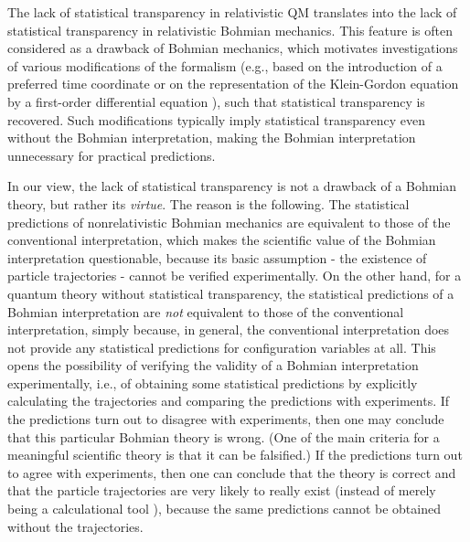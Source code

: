 \documentclass[11pt]{article}
\begin{document}
The lack of statistical transparency in relativistic QM
translates into the lack of statistical transparency in relativistic 
Bohmian mechanics. This feature is often considered as a drawback
of Bohmian mechanics, which motivates investigations of 
various modifications 
of the formalism (e.g., based on the introduction of a preferred 
time coordinate \cite{holpra} or on the representation of the 
Klein-Gordon equation by a first-order differential equation 
\cite{holNC}), 
such that statistical transparency is recovered.
Such modifications typically imply statistical transparency 
even without the Bohmian interpretation, making the Bohmian 
interpretation unnecessary for practical predictions.  

In our view, the lack of statistical transparency  
is not a drawback of a Bohmian theory, 
but rather its {\em virtue}. The reason is the following. 
The statistical predictions of nonrelativistic Bohmian 
mechanics are equivalent to those of the conventional 
interpretation, which makes the scientific value 
of the Bohmian interpretation questionable, because its basic 
assumption - the existence of particle trajectories - cannot 
be verified experimentally. On the other hand, for a quantum 
theory without statistical transparency, the statistical 
predictions of a Bohmian interpretation are {\em not} equivalent 
to those of the conventional interpretation, simply because,
in general,  
the conventional interpretation does not provide any 
statistical predictions for configuration variables at all. 
This opens the possibility
of verifying the validity of a Bohmian interpretation
experimentally,  
i.e., of obtaining some statistical predictions by explicitly 
calculating the trajectories and comparing the predictions with 
experiments. If the predictions turn out to disagree with experiments, 
then one may conclude that this particular Bohmian theory 
is wrong. (One of the main criteria for 
a meaningful scientific theory is that it can be falsified.) 
If the predictions turn out to agree 
with experiments, then one can conclude that the theory 
is correct and that the particle trajectories 
are very likely to really exist (instead of merely being a calculational 
tool \cite{lop}), 
because the same predictions cannot be obtained without 
the trajectories.
     
\end{document}
